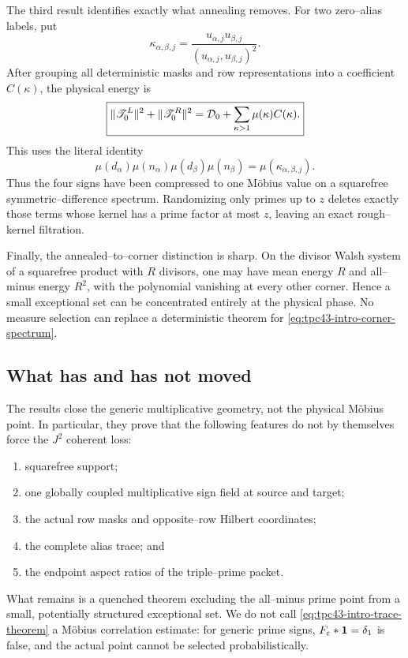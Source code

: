 The third result identifies exactly what annealing removes.  For two
zero--alias labels, put
\begin{equation}
 \kappa_{\alpha,\beta,j}
 =\frac{u_{\alpha,j}u_{\beta,j}}
 {(u_{\alpha,j},u_{\beta,j})^2}.
 \label{eq:tpc43-intro-kernel}
\end{equation}
After grouping all deterministic masks and row representations into a
coefficient \(C(\kappa)\), the physical energy is
\begin{equation}
 \boxed{
 \|\mathscr T_0^L\|^2+\|\mathscr T_0^R\|^2
 =\mathcal D_0+\sum_{\kappa>1}\mu(\kappa)C(\kappa).}
 \label{eq:tpc43-intro-corner-spectrum}
\end{equation}
This uses the literal identity
\begin{equation}
 \mu(d_\alpha)\mu(n_\alpha)
 \mu(d_\beta)\mu(n_\beta)
 =\mu(\kappa_{\alpha,\beta,j}).
 \label{eq:tpc43-intro-four-to-one}
\end{equation}
Thus the four signs have been compressed to one M\"obius value on a
squarefree symmetric--difference spectrum.  Randomizing only primes up
to \(z\) deletes exactly those terms whose kernel has a prime factor at
most \(z\), leaving an exact rough--kernel filtration.

Finally, the annealed--to--corner distinction is sharp.  On the divisor
Walsh system of a squarefree product with \(R\) divisors, one may have
mean energy \(R\) and all--minus energy \(R^2\), with the polynomial
vanishing at every other corner.  Hence a small exceptional set can be
concentrated entirely at the physical phase.  No measure selection can
replace a deterministic theorem for
\eqref{eq:tpc43-intro-corner-spectrum}.

\subsection{What has and has not moved}

The results close the generic multiplicative geometry, not the physical
M\"obius point.  In particular, they prove that the following features
do not by themselves force the \(J^2\) coherent loss:
\begin{enumerate}[label=(\roman*)]
 \item squarefree support;
 \item one globally coupled multiplicative sign field at source and
 target;
 \item the actual row masks and opposite--row Hilbert coordinates;
 \item the complete alias trace; and
 \item the endpoint aspect ratios of the triple--prime packet.
\end{enumerate}
What remains is a quenched theorem excluding the all--minus prime point
from a small, potentially structured exceptional set.  We do not call
\eqref{eq:tpc43-intro-trace-theorem} a M\"obius correlation estimate:
for generic prime signs, \(F_\varepsilon*\mathbf 1=\delta_1\) is false, and
the actual point cannot be selected probabilistically.

